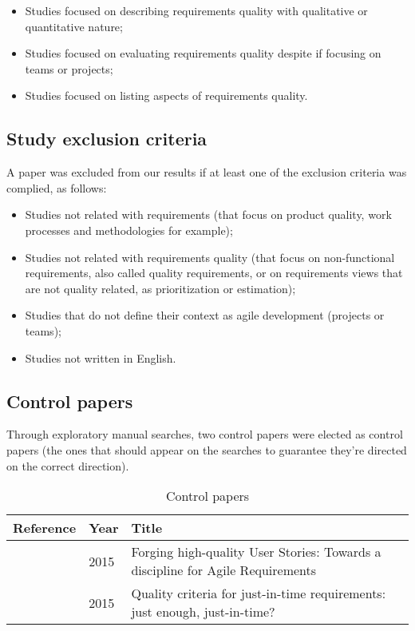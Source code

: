 \begin{itemize}[noitemsep,nolistsep]
    \item Studies focused on describing requirements quality with qualitative or quantitative nature;
    \item Studies focused on evaluating requirements quality despite if focusing on teams or projects;
    \item Studies focused on listing aspects of requirements quality.
\end{itemize}

\subsection{Study exclusion criteria}

A paper was excluded from our results if at least one of the exclusion criteria was complied, as follows:

\begin{itemize}[noitemsep,nolistsep]
    \item Studies not related with requirements (that focus on product quality, work processes and methodologies for example);
    \item Studies not related with requirements quality (that focus on non-functional requirements, also called quality requirements, or on requirements views that are not quality related, as prioritization or estimation);
    \item Studies that do not define their context as agile development (projects or teams);
    \item Studies not written in English.
\end{itemize}

\subsection{Control papers}

Through exploratory manual searches, two control papers were elected as control papers (the ones that should appear on the searches to guarantee they're directed on the correct direction). 

\begin{table}[!h]
\renewcommand{\arraystretch}{1.3}
\caption{Control papers}
\label{table_controle}
\centering
\begin{tabular}{|m{2cm}||m{1cm}||m{12cm}|}
\hline
Reference & Year & Title  \\ 
\hline\hline
 \cite{Lucassen_et_dot_al_2015} & 2015 & Forging high-quality User Stories: Towards a discipline for Agile Requirements \\
 \hline
 \cite{Heck_and_Zaidman_2015} & 2015 & Quality criteria for just-in-time requirements: just enough, just-in-time? \\
\hline
\end{tabular}
\end{table}